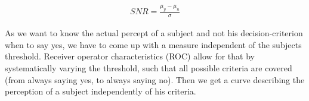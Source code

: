 \documentclass[../main/Notes.tex]{subfiles}
\begin{document}
\begin{align*}
SNR = \frac{\mu_y-\mu_n}{\sigma}  
\end{align*} 

As we want to know the actual percept of a subject and not his decision-criterion when to say yes, we have to come up with a measure independent of the subjects threshold.
Receiver operator characteristics (ROC) allow for that by systematically varying the threshold, such that all possible criteria are covered (from always saying yes, to always saying no). Then we get a curve describing the perception of a subject independently of his criteria.

\bigskip
\begin{center}
\end{center}
 
\end{document}
